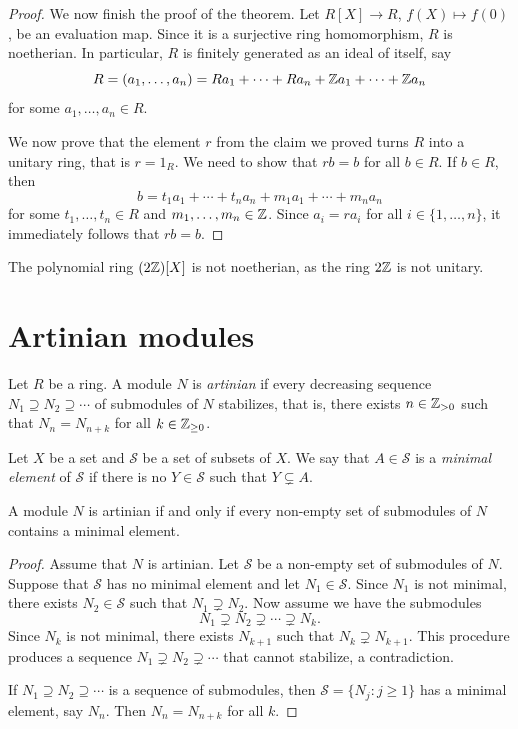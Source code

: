 \begin{proof}
    We now finish the proof of the theorem. 
    Let $R[X]\to R$, $f(X)\mapsto f(0)$, be an evaluation map. Since
    it is a surjective ring homomorphism, 
    $R$ is noetherian. In particular, $R$ is finitely generated as an ideal of itself, 
    say 
    \[
    R=(a_1,\dots,a_n)=Ra_1+\cdots+Ra_n+\mathbb{Z} a_1+\cdots+\mathbb{Z} a_n
    \]
    for some $a_1,\dots,a_n\in R$. 
    
    We now prove that the element $r$ from the claim we proved turns 
    $R$ into a unitary ring, that is $r=1_R$.  
    We need to show that $rb=b$ for all $b\in R$. 
    If $b\in R$, then 
    \[
    b=t_1a_1+\cdots+t_na_n+m_1a_1+\cdots+m_na_n
    \]
    for some $t_1,\dots,t_n\in R$ and $m_1,\dots,m_n\in\mathbb{Z}$. 
    Since $a_i=ra_i$ for all $i\in\{1,\dots,n\}$, it immediately
    follows that
    $rb=b$. 
\end{proof}

\begin{example}
    The polynomial ring $(2\mathbb{Z})[X]$ is not 
    noetherian, as the ring $2\mathbb{Z}$ is not unitary. 
\end{example}

\section{Artinian modules}

\begin{definition}
	Let $R$ be a ring. A module $N$ is \emph{artinian} if every decreasing sequence 
	$N_1\supseteq N_2\supseteq\cdots$ of submodules of $N$ stabilizes, that is, 
	there exists $n\in\mathbb{Z}_{>0}$ such that 
	$N_n=N_{n+k}$ for all $k\in\mathbb{Z}_{\geq0}$.
\end{definition}

Let $X$ be a set and $\mathcal{S}$ be a set of subsets of $X$. 
We say that $A\in\mathcal{S}$ is a \emph{minimal element} of $\mathcal{S}$
if there is no $Y\in\mathcal{S}$ such that $Y\subsetneq A$. 

\begin{proposition}
\label{pro:artinian_minimal}
	A module $N$ is artinian if and only if 
	every non-empty set of submodules of $N$ 
	contains a minimal element. 
\end{proposition}

\begin{proof}
	Assume that $N$ is artinian. Let $\mathcal{S}$ be a non-empty set of submodules of $N$. 
	Suppose that $\mathcal{S}$ has no minimal element and let $N_1\in\mathcal{S}$. 
	Since $N_1$ is not minimal, there exists 
	$N_2\in\mathcal{S}$ such that $N_1\supsetneq N_2$. Now assume we have the submodules 
	\[
	N_1\supsetneq N_2\supsetneq\cdots\supsetneq N_k.
	\]
	Since $N_k$ is not minimal, there exists $N_{k+1}$ such that $N_k\supsetneq N_{k+1}$.
	This procedure produces a sequence $N_1\supsetneq
	N_2\supsetneq\cdots$ that cannot stabilize, a contradiction. 
	
	If $N_1\supseteq N_2\supseteq\cdots$ is a sequence of submodules, then 
	$\mathcal{S}=\{N_j:j\geq1\}$ has a minimal element, say $N_n$. Then
	$N_n=N_{n+k}$ for all $k$. 
\end{proof}

